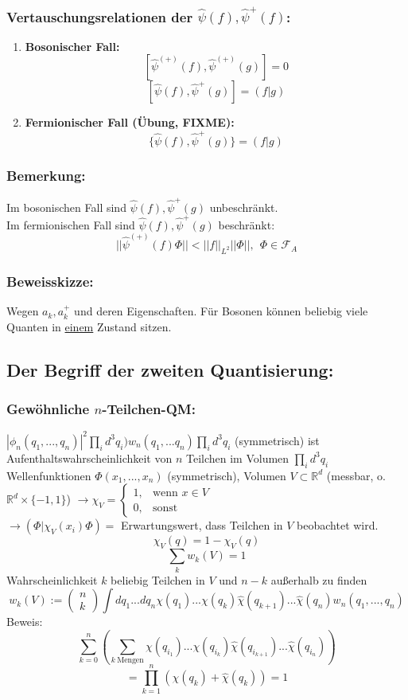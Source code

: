 \documentclass[twoside,a4paper]{scrartcl}
\newcommand{\R}{\mathbb{R}}
\renewcommand{\1}{\mathds{1}}
\newcommand{\ra}{\rightarrow}
\newcommand{\F}{\mathcal{F}}
\renewcommand{\R}{\mathbb{R}}
\begin{document}
\subsubsection*{Vertauschungsrelationen der $\hat \psi(f), \hat \psi^+(f)$:}
\begin{enumerate}
\item \textbf{Bosonischer Fall:}
$$[\hat \psi^{(+)}(f),\hat \psi^{(+)}(g)]=0$$
$$[\hat \psi(f),\hat \psi^{+}(g)]=(f|g)$$
\item \textbf{Fermionischer Fall (Übung, FIXME):}
$$\{\hat \psi(f),\hat \psi^{+}(g)\}=(f|g)$$
\end{enumerate}
\subsubsection*{Bemerkung:}
Im bosonischen Fall sind $\hat \psi(f), \hat \psi^+(g)$ unbeschränkt.\\
Im fermionischen Fall sind $\hat \psi(f), \hat \psi^+(g)$ beschränkt:
$$||\hat \psi^{(+)}(f)\Phi||<||f||_{L^2}||\Phi||, \ \ \Phi \in \F_A$$
\subsubsection*{Beweisskizze:}
Wegen $a_k, a_k^+$ und deren Eigenschaften. Für Bosonen können beliebig viele Quanten in \underline{einem} Zustand sitzen.

\subsection{Der Begriff der zweiten Quantisierung:}
\subsubsection{Gewöhnliche $n$-Teilchen-QM:}
$|\phi_n(q_1,...,q_n)|^2\prod_i d^3q_i)w_n(q_1,...q_n)\prod_i d^3q_i$ (symmetrisch) ist Aufenthaltswahrscheinlichkeit von $n$ Teilchen im Volumen $\prod_i d^3q_i$\\
Wellenfunktionen $\Phi(x_1,...,x_n)$ (symmetrisch), Volumen $V \subset \R^d$ (messbar, o. $\R^d\times \{-1,1\}$) $\ra \chi_V=\begin{cases}
  1,  & \text{wenn }x \in V\\
  0, & \text{sonst}
\end{cases}$\\
$\ra (\Phi|\chi_V(x_i)\Phi)=$ Erwartungswert, dass Teilchen in $V$ beobachtet wird.
$$\hat \chi_V(q)=1-\chi_V(q)$$
$$\sum_k w_k(V)=1$$
Wahrscheinlichkeit $k$ beliebig Teilchen in $V$ und $n-k$ außerhalb zu finden
$$w_k(V):=\begin{pmatrix}n \\ k\end{pmatrix}\int dq_1...dq_n \chi(q_1)...\chi(q_k)\hat \chi(q_{k+1})...\hat \chi(q_n)w_n(q_1,...,q_n)$$
Beweis:
$$\sum_{k=0}^n (\sum_{k \ \mathrm{Mengen}}\chi(q_{i_1})...\chi(q_{i_k})\hat \chi(q_{i_{k+1}})...\hat \chi(q_{i_n}))$$
$$=\prod_{k=1}^n (\chi(q_k)+\hat \chi(q_k))=1$$
\end{document}

